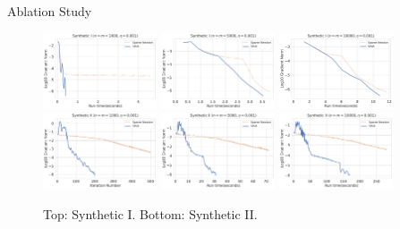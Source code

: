 \begin{frame}{Ablation Study}
    \begin{figure}[h]
        \centering
        \includegraphics[width=0.3\textwidth]{save/Synthetic I - Ablation/run_times/n=1000, m=1000, reg=0.001}
        \includegraphics[width=0.3\textwidth]{save/Synthetic I - Ablation/run_times/n=5000, m=5000, reg=0.001}
        \includegraphics[width=0.3\textwidth]{save/Synthetic I - Ablation/run_times/n=10000, m=10000, reg=0.001} \\
        \includegraphics[width=0.3\textwidth]{save/Synthetic II - Ablation/iterations/n=1000, m=1000, reg=0.001.pdf}
        \includegraphics[width=0.3\textwidth]{save/Synthetic II - Ablation/run_times/n=5000, m=5000, reg=0.001.pdf}
        \includegraphics[width=0.3\textwidth]{save/Synthetic II - Ablation/run_times/n=10000, m=10000, reg=0.001.pdf}
        \caption{Top: Synthetic I. Bottom: Synthetic II.}
        \label{fig:effect_low_rank_i}
    \end{figure}
\end{frame}